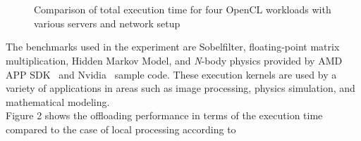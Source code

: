\documentclass[10pt, conference, compsocconf]{IEEEtran}
\begin{document}
\begin{figure}
 	\centering
		\\ 
		\\
	\caption{Comparison of total execution time for four OpenCL
workloads with various servers and network setup}
\end{figure}
%
\indent The benchmarks used in the experiment are Sobelfilter, floating-point
matrix multiplication, Hidden Markov Model, and \textit{N}-body physics
provided by AMD APP SDK~\cite{amd} and Nvidia~\cite{nvidia} sample code.
%
These execution kernels are used by a variety of applications in areas such as image
processing, physics simulation, and mathematical modeling.\\
%
%
\indent Figure 2 shows the offloading performance in terms of the
execution time compared to the case of local processing according to
\end{document}
